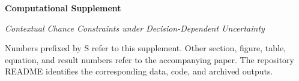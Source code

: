 \documentclass[11pt,letterpaper]{article}
\begin{document}
\begin{center}
{\LARGE\bfseries Computational Supplement\par}
\vspace{.45em}
{\large\itshape Contextual Chance Constraints under Decision-Dependent Uncertainty\par}
\end{center}
Numbers prefixed by S refer to this supplement. Other section, figure, table, equation, and result numbers refer to the accompanying paper. The repository README identifies the corresponding data, code, and archived outputs.
\tableofcontents







\end{document}
